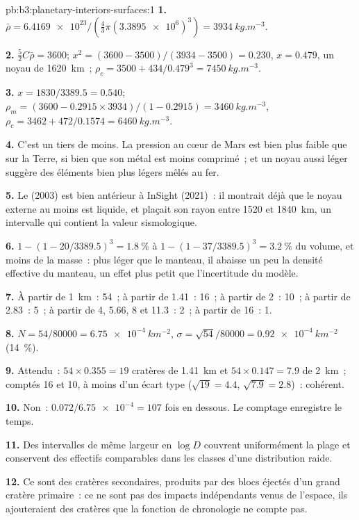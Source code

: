 \begin{solution}{pb:b3:planetary-interiors-surfaces:1}
\textbf{1.} $\bar\rho = \num{6.4169e23}/(\tfrac43\pi(\num{3.3895e6})^3) =
\qty{3934}{kg.m^{-3}}$.

\textbf{2.} $\tfrac52C\bar\rho = 3600$; $x^2 = (3600 - 3500)/(3934 - 3500) =
0.230$, $x = 0.479$, un noyau de \qty{1620}{km}~; $\rho_c = 3500 +
434/0.479^3 = \qty{7450}{kg.m^{-3}}$.

\textbf{3.} $x = 1830/3389.5 = 0.540$; $\rho_m = (3600 - 0.2915\times
3934)/(1 - 0.2915) = \qty{3460}{kg.m^{-3}}$, $\rho_c = 3462 +
472/0.1574 = \qty{6460}{kg.m^{-3}}$.

\textbf{4.} C'est un tiers de moins. La pression au cœur de Mars est bien
plus faible que sur la Terre, si bien que son métal est moins comprimé~; et
un noyau aussi léger suggère des éléments bien plus légers mêlés au fer.

\textbf{5.} Le  (2003) est bien antérieur à InSight (2021)~: il
montrait déjà que le noyau externe au moins est liquide, et plaçait son rayon
entre 1520 et \qty{1840}{km}, un intervalle qui contient la valeur
sismologique.

\textbf{6.} $1 - (1 - 20/3389.5)^3 = \qty{1.8}{\percent}$ à $1 - (1 -
37/3389.5)^3 = \qty{3.2}{\percent}$ du volume, et moins de la masse~:
plus léger que le manteau, il abaisse un peu la densité effective du manteau,
un effet plus petit que l'incertitude du modèle.

\textbf{7.} À partir de \qty{1}{km}~: 54~; à partir de 1.41~: 16~; à partir de 2~: 10~; à partir de 2.83~: 5~;
à partir de 4, 5.66, 8 et 11.3~: 2~; à partir de 16~: 1.

\textbf{8.} $N = 54/80000 = \qty{6.75e-4}{km^{-2}}$, $\sigma = \sqrt{54}/80000
= \qty{0.92e-4}{km^{-2}}$ (\qty{14}{\percent}).

\textbf{9.} Attendu~: $54\times0.355 = 19$ cratères de \qty{1.41}{km} et
$54\times0.147 = 7.9$ de \qty{2}{km}~; comptés 16 et 10, à moins d'un écart
type ($\sqrt{19} = 4.4$, $\sqrt{7.9} = 2.8$)~: cohérent.

\textbf{10.} Non~: $0.072/\num{6.75e-4} = 107$ fois en dessous. Le comptage
enregistre le temps.

\textbf{11.} Des intervalles de même largeur en $\log D$ couvrent uniformément la plage
et conservent des effectifs comparables dans les classes d'une distribution raide.

\textbf{12.} Ce sont des cratères secondaires, produits par des blocs éjectés
d'un grand cratère primaire~: ce ne sont pas des impacts indépendants venus de
l'espace, ils ajouteraient des cratères que la fonction de chronologie ne compte pas.


\end{solution}
